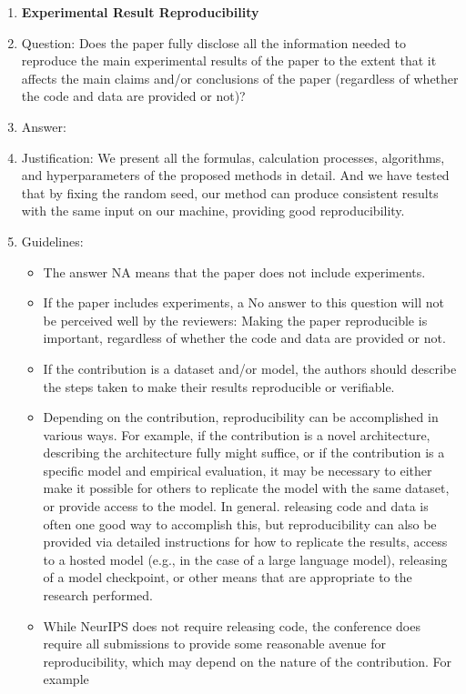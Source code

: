 \documentclass{article}
\begin{document}
\begin{enumerate}
    \item {\bf Experimental Result Reproducibility}
    \item[] Question: Does the paper fully disclose all the information needed to reproduce the main experimental results of the paper to the extent that it affects the main claims and/or conclusions of the paper (regardless of whether the code and data are provided or not)?
    \item[] Answer: \answerYes{} %
    \item[] Justification: We present all the formulas, calculation processes, algorithms, and hyperparameters of the proposed methods in detail. And we have tested that by fixing the random seed, our method can produce consistent results with the same input on our machine, providing good reproducibility.
    \item[] Guidelines:
    \begin{itemize}
        \item The answer NA means that the paper does not include experiments.
        \item If the paper includes experiments, a No answer to this question will not be perceived well by the reviewers: Making the paper reproducible is important, regardless of whether the code and data are provided or not.
        \item If the contribution is a dataset and/or model, the authors should describe the steps taken to make their results reproducible or verifiable. 
        \item Depending on the contribution, reproducibility can be accomplished in various ways. For example, if the contribution is a novel architecture, describing the architecture fully might suffice, or if the contribution is a specific model and empirical evaluation, it may be necessary to either make it possible for others to replicate the model with the same dataset, or provide access to the model. In general. releasing code and data is often one good way to accomplish this, but reproducibility can also be provided via detailed instructions for how to replicate the results, access to a hosted model (e.g., in the case of a large language model), releasing of a model checkpoint, or other means that are appropriate to the research performed.
        \item While NeurIPS does not require releasing code, the conference does require all submissions to provide some reasonable avenue for reproducibility, which may depend on the nature of the contribution. For example

\end{itemize}
\end{enumerate}
\end{document}
